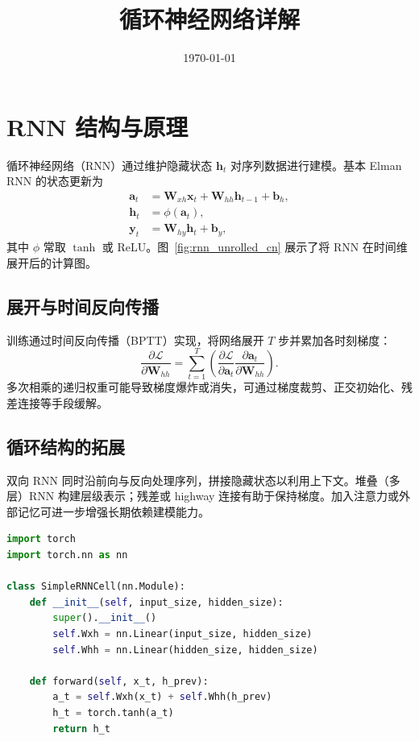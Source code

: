 ﻿\documentclass[UTF8,zihao=-4]{ctexart}
\title{循环神经网络详解}
\author{}
\date{\today}
\begin{document}
\maketitle

\section{RNN 结构与原理}
循环神经网络（RNN）通过维护隐藏状态 $\mathbf{h}_t$ 对序列数据进行建模。基本 Elman RNN 的状态更新为
\begin{align}
  \mathbf{a}_t &= \mathbf{W}_{xh} \mathbf{x}_t + \mathbf{W}_{hh} \mathbf{h}_{t-1} + \mathbf{b}_h, \\
  \mathbf{h}_t &= \phi(\mathbf{a}_t), \\
  \mathbf{y}_t &= \mathbf{W}_{hy} \mathbf{h}_t + \mathbf{b}_y,
\end{align}
其中 $\phi$ 常取 $\tanh$ 或 ReLU。图~\ref{fig:rnn_unrolled_cn} 展示了将 RNN 在时间维展开后的计算图。

\subsection{展开与时间反向传播}
训练通过时间反向传播（BPTT）实现，将网络展开 $T$ 步并累加各时刻梯度：
\begin{equation}
  \frac{\partial \mathcal{L}}{\partial \mathbf{W}_{hh}} = \sum_{t=1}^{T} \left( \frac{\partial \mathcal{L}}{\partial \mathbf{a}_t} \frac{\partial \mathbf{a}_t}{\partial \mathbf{W}_{hh}} \right).
\end{equation}
多次相乘的递归权重可能导致梯度爆炸或消失，可通过梯度裁剪、正交初始化、残差连接等手段缓解。

\subsection{循环结构的拓展}
双向 RNN 同时沿前向与反向处理序列，拼接隐藏状态以利用上下文。堆叠（多层）RNN 构建层级表示；残差或 highway 连接有助于保持梯度。加入注意力或外部记忆可进一步增强长期依赖建模能力。

\begin{lstlisting}[language=Python, caption={PyTorch Elman RNN 单元示例。}]
import torch
import torch.nn as nn

class SimpleRNNCell(nn.Module):
    def __init__(self, input_size, hidden_size):
        super().__init__()
        self.Wxh = nn.Linear(input_size, hidden_size)
        self.Whh = nn.Linear(hidden_size, hidden_size)

    def forward(self, x_t, h_prev):
        a_t = self.Wxh(x_t) + self.Whh(h_prev)
        h_t = torch.tanh(a_t)
        return h_t
\end{lstlisting}
\end{document}
